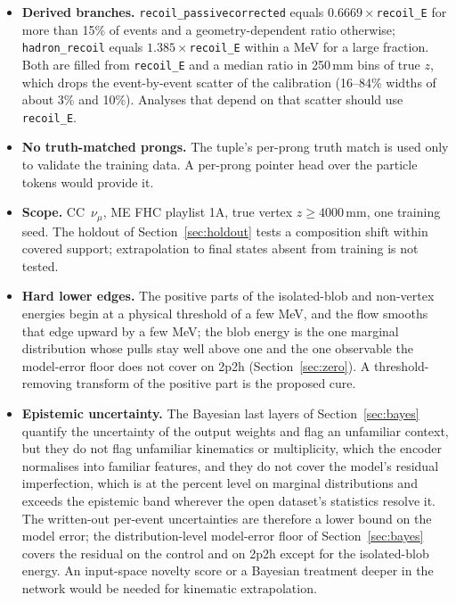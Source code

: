 \documentclass[11pt]{article}
\begin{document}
\begin{itemize}
\item \textbf{Derived branches.} \texttt{recoil\_passivecorrected} equals $0.6669\times$\texttt{recoil\_E} for more
  than 15\% of events and a geometry-dependent ratio otherwise; \texttt{hadron\_recoil} equals
  $1.385\times$\texttt{recoil\_E} within a MeV for a large fraction. Both are filled from \texttt{recoil\_E} and
  a median ratio in 250\,mm bins of true $z$, which drops the event-by-event scatter of the calibration (16--84\%
  widths of about 3\% and 10\%). Analyses that depend on that scatter should use \texttt{recoil\_E}.
\item \textbf{No truth-matched prongs.} The tuple's per-prong truth match is used only to validate the training
  data. A per-prong pointer head over the particle tokens would provide it.
\item \textbf{Scope.} CC~$\nu_\mu$, ME FHC playlist 1A, true vertex $z \ge 4000$\,mm, one training seed.
  The holdout of Section~\ref{sec:holdout} tests a composition shift within covered support; extrapolation to
  final states absent from training is not tested.
\item \textbf{Hard lower edges.} The positive parts of the isolated-blob and non-vertex energies begin at a
  physical threshold of a few MeV, and the flow smooths that edge upward by a few MeV; the blob energy is the one
  marginal distribution whose pulls stay well above one and the one observable the model-error floor does not
  cover on 2p2h (Section~\ref{sec:zero}). A threshold-removing transform of the positive part is the proposed cure.
\item \textbf{Epistemic uncertainty.} The Bayesian last layers of Section~\ref{sec:bayes} quantify the
  uncertainty of the output weights and flag an unfamiliar context, but they do not flag unfamiliar kinematics or
  multiplicity, which the encoder normalises into familiar features, and they do not cover the model's residual
  imperfection, which is at the percent level on marginal distributions and exceeds the epistemic band wherever
  the open dataset's statistics resolve it. The written-out per-event uncertainties are therefore a lower bound
  on the model error; the distribution-level model-error floor of Section~\ref{sec:bayes} covers the residual
  on the control and on 2p2h except for the isolated-blob energy. An input-space novelty score or a Bayesian
  treatment deeper in the network would be needed for kinematic extrapolation.
\end{itemize}
\end{document}
